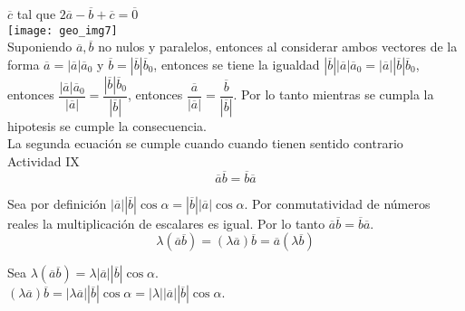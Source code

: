\documentclass[11pt,a4paper]{article}
\begin{document}
\begin{justify}
\noindent
$\overline{c}$ tal que $2\overline{a}-\overline{b}+\overline{c} = \overline{0}$\\
\texttt{[image: geo\_img7]}\\

\noindent
\noindent
Suponiendo $\overline{a}, \overline{b}$ no nulos y paralelos, entonces al considerar ambos vectores de la forma $\overline{a} = |\overline{a}|\overline{a}_0$ y $\overline{b} = |\overline{b}|\overline{b}_0$, entonces se tiene la igualdad $|\overline{b}||\overline{a}|\overline{a}_0 = |\overline{a}||\overline{b}|\overline{b}_0$, entonces $\dfrac{|\overline{a}|\overline{a}_0}{|\overline{a}|} = \dfrac{|\overline{b}|\overline{b}_0}{|\overline{b}|}$, entonces $\dfrac{\overline{a}}{|\overline{a}|} =\dfrac{\overline{b}}{|\overline{b}|}$. Por lo tanto mientras se cumpla la hipotesis se cumple la consecuencia.\\

\noindent
La segunda ecuación se cumple cuando cuando tienen sentido contrario\\

\noindent
Actividad IX\\

\noindent
$$ \overline{a}\overline{b} = \overline{b}\overline{a} $$

Sea por definición $|\overline{a}||\overline{b}| \cos \alpha = |\overline{b}||\overline{a}| \cos \alpha$. Por conmutatividad de números reales la multiplicación de escalares es igual. Por lo tanto $ \overline{a}\overline{b} = \overline{b}\overline{a} $.\\

$$ \lambda (\overline{a}\overline{b}) = (\lambda \overline{a})\overline{b} = \overline{a}(\lambda \overline{b}) $$


\noindent
Sea $\lambda (\overline{a}\overline{b}) = \lambda |\overline{a}||\overline{b}|\cos \alpha$.\\

\noindent
$(\lambda \overline{a})\overline{b} = |\lambda \overline{a}||\overline{b}| \cos \alpha = |\lambda || \overline{a}||\overline{b}| \cos \alpha$.\\


\end{justify}



\newpage

\nocite{tippens2007fisica}



\end{document}
